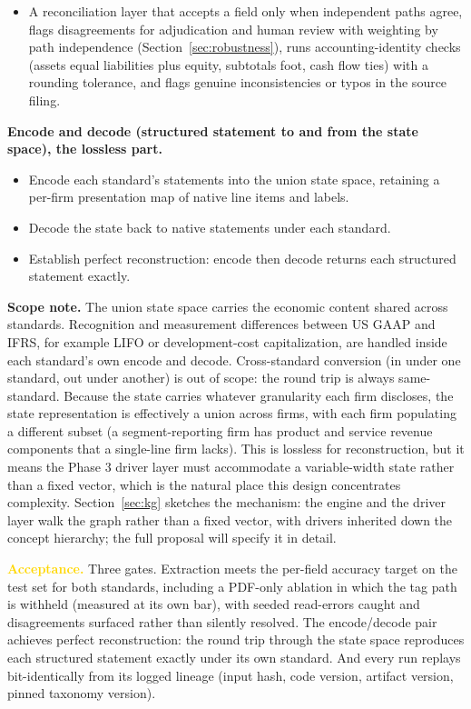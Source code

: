 \documentclass[11pt]{article}
\newcommand{\lead}[2]{\par\addvspace{5pt}\textbf{\textcolor{#1}{#2}}}
\begin{document}
\begin{itemize}
  \item A reconciliation layer that accepts a field only when independent paths agree, flags disagreements for adjudication and human review with weighting by path independence (Section~\ref{sec:robustness}), runs accounting-identity checks (assets equal liabilities plus equity, subtotals foot, cash flow ties) with a rounding tolerance, and flags genuine inconsistencies or typos in the source filing.
\end{itemize}
\lead{navytwo}{Encode and decode (structured statement to and from the state space), the lossless part.}
\begin{itemize}
  \item Encode each standard's statements into the union state space, retaining a per-firm presentation map of native line items and labels.
  \item Decode the state back to native statements under each standard.
  \item Establish perfect reconstruction: encode then decode returns each structured statement exactly.
\end{itemize}
\lead{navytwo}{Scope note.} The union state space carries the economic content shared across standards. Recognition and measurement differences between US GAAP and IFRS, for example LIFO or development-cost capitalization, are handled inside each standard's own encode and decode. Cross-standard conversion (in under one standard, out under another) is out of scope: the round trip is always same-standard. Because the state carries whatever granularity each firm discloses, the state representation is effectively a union across firms, with each firm populating a different subset (a segment-reporting firm has product and service revenue components that a single-line firm lacks). This is lossless for reconstruction, but it means the Phase 3 driver layer must accommodate a variable-width state rather than a fixed vector, which is the natural place this design concentrates complexity. Section~\ref{sec:kg} sketches the mechanism: the engine and the driver layer walk the graph rather than a fixed vector, with drivers inherited down the concept hierarchy; the full proposal will specify it in detail.

\lead{gold}{Acceptance.} Three gates. Extraction meets the per-field accuracy target on the test set for both standards, including a PDF-only ablation in which the tag path is withheld (measured at its own bar), with seeded read-errors caught and disagreements surfaced rather than silently resolved. The encode/decode pair achieves perfect reconstruction: the round trip through the state space reproduces each structured statement exactly under its own standard. And every run replays bit-identically from its logged lineage (input hash, code version, artifact version, pinned taxonomy version).
\end{document}
